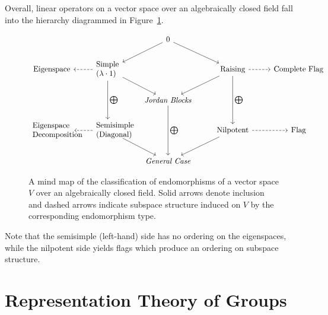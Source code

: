 		Overall, linear operators on a vector space over an algebraically closed field fall into the hierarchy diagrammed in Figure~\ref{fig:JNF}.
		\begin{center}
		\begin{figure}[h]
			\[
			\begin{tikzcd}
			   & & 0\arrow[ld] \arrow[rd] & &\\
			  \text{Eigenspace} & \arrow[l,dashed] \parbox{3em}{Simple\\($\lambda \cdot 1$)} \arrow[dd,"\bigoplus"]\arrow[rd] & & \text{Raising} \arrow[dd,"\bigoplus"]\arrow[ld] \arrow[r,dashed] & \text{Complete Flag} \\
			  & & \text{\textit{Jordan Blocks}} \arrow[dd,"\bigoplus"] & &\\
			  \parbox{5em}{Eigenspace\\ Decomposition}&\parbox{3em}{Semisimple\\(Diagonal)} \arrow[dr]\arrow[l,dashed] & & \text{Nilpotent} \arrow[dl] \arrow[r,dashed] & \text{Flag}\\
			  && \text{\textit{General Case}} &&
			\end{tikzcd}
			\]
			\caption{A mind map of the classification of endomorphisms of a vector space $V$ over an algebraically closed field. Solid arrows denote inclusion and dashed arrows indicate subspace structure induced on $V$ by the corresponding endomorphism type.}
			\label{fig:JNF}
		\end{figure}			
		\end{center}

		Note that the semisimple (left-hand) side has no ordering on the eigenspaces, while the nilpotent side yields flags which produce an ordering on subspace structure.


	\section{Representation Theory of Groups} %
	\label{sec:representation_theory_of_groups}

